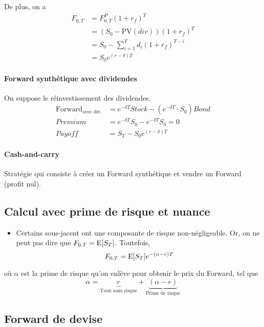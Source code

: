 \documentclass[10pt, french]{article}
\begin{document}
\begin{multicols*}{2}
De plus, on a
\begin{align*}
F_{0,T} & = F_{0,T}^{P} (1 + r_f)^{T} \\
& = (S_0 - \text{PV}(div))(1+r_f)^{T} \\
& = S_0 - \sum_{i=1}^{T} d_i (1+r_f)^{T-i} \\
& = S_0 e^{(r-\delta)T}
\end{align*}

\paragraph{Forward synthétique avec dividendes}
On suppose le réinvestissement des dividendes.
\begin{align*}
\text{Forward}_{\text{avec div.}} & = e^{-\delta T} Stock - (e^{-\delta T} \cdot S_0) Bond \\
Premium		& =  e^{-\delta T} S_0 - e^{-\delta T} S_0 = 0 \\
Payoff			& = S_T - S_0 e^{(r-\delta) T}
\end{align*}

\paragraph{Cash-and-carry}
Stratégie qui consiste  à créer un Forward synthétique et vendre un Forward (profit nul).


\subsection*{Calcul avec prime de risque et nuance}
\begin{itemize}
\item Certains sous-jacent ont une composante de risque non-négligeable. Or, on ne peut pas dire que $F_{0,T} = \mathrm{E} {\left[ S_T \right]}$. Toutefois,
\[F_{0,T} = \mathrm{E} {\left[ S_T \right]} e^{-(\alpha - r) T}\]
\end{itemize}
où $\alpha$ est la prime de risque 	qu'on enlève pour obtenir le prix du Forward, tel que
\[\alpha = \underbrace{r}_{\text{Taux sans risque}} + \underbrace{(\alpha - r)}_{\text{Prime de risque}}\]

\subsection*{Forward de devise}

\end{multicols*}
\end{document}
